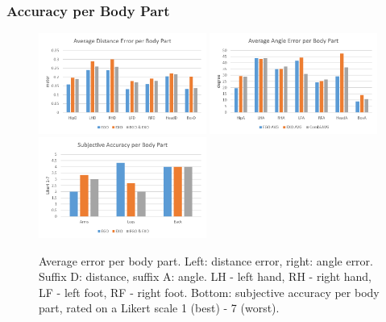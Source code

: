 \subsubsection{Accuracy per Body Part}
\label{sec:evalAccBodyPart}
\begin{figure}[H]
	\centering
	\includegraphics[width=0.49\textwidth]{figures/averageDistanceErrorPerBodyPart.png}
	\includegraphics[width=0.49\textwidth]{figures/averageAngleErrorPerBodyPart.png}
	\includegraphics[width=0.49\textwidth]{figures/subjectiveAccuracyPerBodyPart.png}
	\caption[Overall accuracy per body part]{Average error per body part. Left: distance error, right: angle error. Suffix D: distance, suffix A: angle. LH - left hand, RH - right hand, LF - left foot, RF - right foot. Bottom: subjective accuracy per body part, rated on a  Likert scale 1 (best) - 7 (worst).}
	\label{fig:errorPerBodyPart}
\end{figure}

